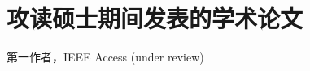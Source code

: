 \documentclass[type=master, oneside]{fduthesis}
\begin{document}
\begin{comment}
最后，我还要感谢我的妻子季慧女士以及我所有的家人，在这三年里你们的支持和付出是我强大的精神后盾。还有太多需要感谢的人无法一一列出，在此向你们表示衷心的感谢，感谢你们一直以来的关心、支持和帮助。
\end{comment}

\chapter{攻读硕士期间发表的学术论文}

\begin{comment}
\begin{enumerate}
	\renewcommand{\labelenumi}{[\theenumi].}
    \item \textbf{Pan Wang}, Yunlang Xu, Runze Ding, Weike Liu, Steve Shu, and Xiaofeng Yang. Multi-Kernel Neural Network Sliding Mode Control for Permanent Magnet Linear Synchronous Motors[J]. IEEE Access (under review)
\end{enumerate}


\begin{enumerate}
\renewcommand{\labelenumi}{[\theenumi].}
\item \textbf{XXX}, XXX, XXX, et al. Multi-Kernel Neural Network Sliding Mode Control for Permanent Magnet Linear Synchronous Motors[J]. IEEE Access (under review)
\end{enumerate}
\end{comment}
第一作者，IEEE Access (under review)
\end{document}
